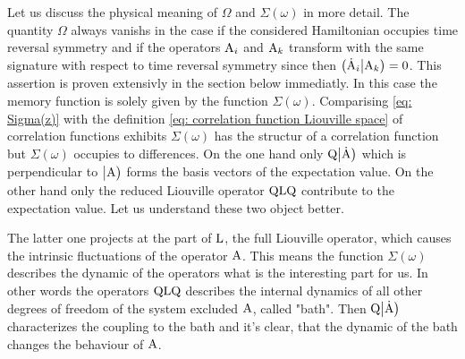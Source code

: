 Let us discuss the physical meaning of $\Omega$ and $\Sigma(\omega)$ in more detail.
The quantity $\Omega$ always vanishs in the case if the considered Hamiltonian occupies time reversal symmetry and if the operators $\mathrm{A}_{i}$ and $\mathrm{A}_{k}$ transform with the same signature with respect to time reversal symmetry since then $\big({\dot{\mathrm{A}}_{i}}\big|{\mathrm{A}_{k}}\big) = 0$.
This assertion is proven extensivly in the section below immediatly.
In this case the memory function is solely given by the function $\Sigma(\omega)$.
Comparising \eqref{eq: Sigma(z)} with the definition \eqref{eq: correlation function Liouville space} of correlation functions  exhibits $\Sigma(\omega)$ has the structur of a correlation function but $\Sigma(\omega)$ occupies to differences.
On the one hand only $\mathrm{Q} \big|{\dot{\mathrm{A}}}\big)$ which is perpendicular to $\big|{\mathrm{A}}\big)$ forms the basis vectors of the expectation value.
On the other hand only the reduced Liouville operator $\mathrm{QLQ}$ contribute to the expectation value.
Let us understand these two object better.

The latter one projects at the part of $\mathrm{L}$, the full Liouville operator, which causes the intrinsic fluctuations of the operator $\mathrm{A}$.
This means the function $\Sigma(\omega)$ describes the dynamic of the operators what is the interesting part for us.
In other words the operators $\mathrm{QLQ}$ describes the internal dynamics of all other degrees of freedom of the system excluded $\mathrm{A}$, called "bath".
Then $\mathrm{Q} \big|{\dot{\mathrm{A}}}\big)$ characterizes the coupling to the bath and it's clear, that the dynamic of the bath changes the behaviour of $\mathrm{A}$.
%
%
